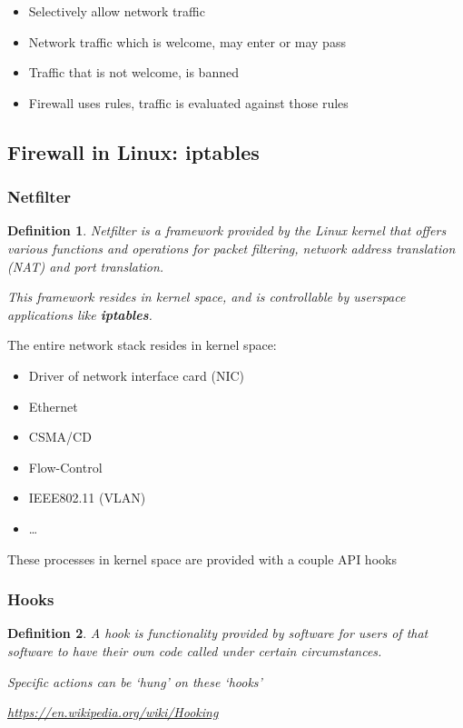 \documentclass{article}
\newtheorem{theorem}{Definition}[section]
\begin{document}
\begin{itemize}
    \item Selectively allow network traffic
    \item Network traffic which is welcome, may enter or may pass
    \item Traffic that is not welcome, is banned
    \item Firewall uses rules, traffic is evaluated against those rules
\end{itemize}

\subsection{Firewall in Linux: iptables}

\subsubsection{Netfilter}

\begin{theorem}
    Netfilter is a framework provided by the Linux kernel that offers
    various functions and operations for packet filtering, network 
    address translation (NAT) and port translation. 

    This framework resides in kernel space, and is controllable by
    userspace applications like \textbf{iptables}.
\end{theorem}

The entire network stack resides in kernel space:

\begin{itemize}
    \item Driver of network interface card (NIC)
    \item Ethernet
    \item CSMA/CD
    \item Flow-Control
    \item IEEE802.11 (VLAN)
    \item \dots
\end{itemize}

These processes in kernel space are provided with a couple API hooks

\subsubsection{Hooks}

\begin{theorem}
    A hook is functionality provided by software for users of that software
    to have their own code called under certain circumstances.

    Specific actions can be `hung' on these `hooks'

    \url{https://en.wikipedia.org/wiki/Hooking}
\end{theorem}
\end{document}

